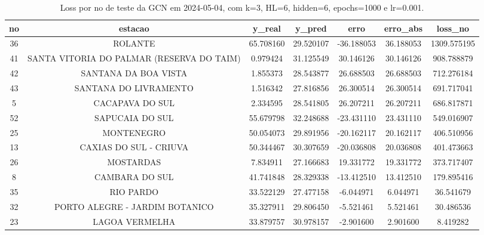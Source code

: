 \begin{table}[h]
\centering
\caption{Loss por no de teste da GCN em 2024-05-04, com k=3, HL=6, hidden=6, epochs=1000 e lr=0.001.}
\label{tab:gcn_loss_k3_hl6_h6_e1000_d20240504}
\begin{tabular}{ccccccc}
\toprule
no & estacao & y\_real & y\_pred & erro & erro\_abs & loss\_no \\
\midrule
36 & ROLANTE & 65.708160 & 29.520107 & -36.188053 & 36.188053 & 1309.575195 \\
41 & SANTA VITORIA DO PALMAR (RESERVA DO TAIM) & 0.979424 & 31.125549 & 30.146126 & 30.146126 & 908.788879 \\
42 & SANTANA DA BOA VISTA & 1.855373 & 28.543877 & 26.688503 & 26.688503 & 712.276184 \\
43 & SANTANA DO LIVRAMENTO & 1.516342 & 27.816856 & 26.300514 & 26.300514 & 691.717041 \\
5 & CACAPAVA DO SUL & 2.334595 & 28.541805 & 26.207211 & 26.207211 & 686.817871 \\
52 & SAPUCAIA DO SUL & 55.679798 & 32.248688 & -23.431110 & 23.431110 & 549.016907 \\
25 & MONTENEGRO & 50.054073 & 29.891956 & -20.162117 & 20.162117 & 406.510956 \\
13 & CAXIAS DO SUL - CRIUVA & 50.344467 & 30.307659 & -20.036808 & 20.036808 & 401.473663 \\
26 & MOSTARDAS & 7.834911 & 27.166683 & 19.331772 & 19.331772 & 373.717407 \\
8 & CAMBARA DO SUL & 41.741848 & 28.329338 & -13.412510 & 13.412510 & 179.895416 \\
35 & RIO PARDO & 33.522129 & 27.477158 & -6.044971 & 6.044971 & 36.541679 \\
32 & PORTO ALEGRE - JARDIM BOTANICO & 35.327911 & 29.806450 & -5.521461 & 5.521461 & 30.486536 \\
23 & LAGOA VERMELHA & 33.879757 & 30.978157 & -2.901600 & 2.901600 & 8.419282 \\
\bottomrule
\end{tabular}
\end{table}
